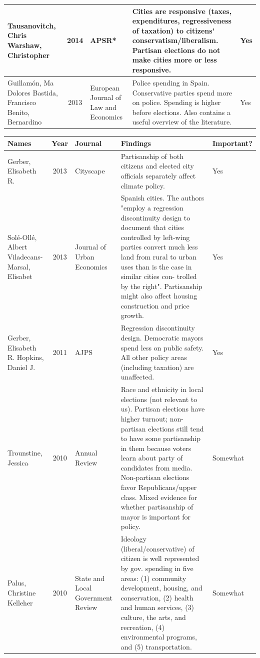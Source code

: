 \documentclass[11pt]{article}
\begin{document}
\begin{landscape}
\begin{table}[htbp]
\begin{tabular}{|p{2cm}|c|p{3cm}|p{12cm}|l|}
		Tausanovitch, Chris
		Warshaw, Christopher & 2014 & APSR* & Cities are responsive (taxes, expenditures, regressiveness of taxation) to citizens' conservatism/liberalism. Partisan elections do not make cities more or less responsive. & Yes \\ \hline
		Guillamón, Ma Dolores
		Bastida, Francisco
		Benito, Bernardino & 2013 & European Journal of Law and Economics & Police spending in Spain. Conservative parties spend more on police. Spending is higher before elections. Also contains a useful overview of the literature. & Yes \\ \hline
	\end{tabular}
	\label{}
\end{table}
\end{landscape}

\begin{landscape}
	\begin{table}[htbp]
		\begin{tabular}{|p{2cm}|c|p{3cm}|p{12cm}|l|}
			\hline
			Names & Year & Journal & Findings & Important? \\ \hline
			Gerber, Elisabeth R. & 2013 & Cityscape & Partisanship of both citizens and elected city officials separately affect climate policy. & Yes \\ \hline
			Solé-Ollé, Albert
			Viladecans-Marsal, Elisabet & 2013 & Journal of Urban Economics & Spanish cities. The authors "employ a regression discontinuity design to document that cities controlled by left-wing parties convert much less land from rural to urban uses than is the case in similar cities con- trolled by the right". Partisanship might also affect housing construction and price growth. & Yes \\ \hline
			Gerber, Elisabeth R.
			Hopkins, Daniel J. & 2011 & AJPS & Regression discontinuity design. Democratic mayors spend less on public safety. All other policy areas (including taxation) are unaffected. & Yes \\ \hline
			Trounstine, Jessica & 2010 & Annual Review & Race and ethnicity in local elections (not relevant to us). Partisan elections have higher turnout; non-partisan elections still tend to have some partisanship in them because voters learn about party of candidates from media. Non-partisan elections favor Republicans/upper class. Mixed evidence for whether partisanship of mayor is important for policy. & Somewhat \\ \hline
			Palus, Christine Kelleher & 2010 & State and Local Government Review & Ideology (liberal/conservative) of citizen is well represented by gov. spending in five areas: (1) community development, housing, and conservation, (2) health and human services, (3) culture, the arts, and recreation, (4) environmental programs, and (5) transportation. & Somewhat \\ \hline

\end{tabular}
\end{table}
\end{landscape}
\end{document}
